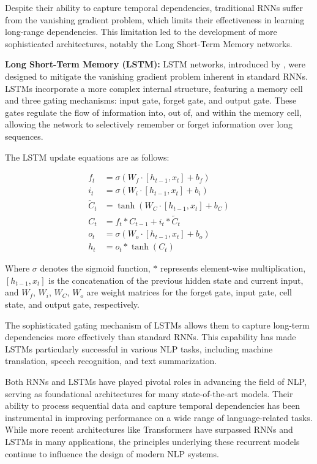 Despite their ability to capture temporal dependencies, traditional RNNs suffer from the vanishing gradient problem, which limits their effectiveness in learning long-range dependencies. This limitation led to the development of more sophisticated architectures, notably the Long Short-Term Memory networks.

\textbf{Long Short-Term Memory (LSTM):}
LSTM networks, introduced by \cite{hochreiter1997long}, were designed to mitigate the vanishing gradient problem inherent in standard RNNs. LSTMs incorporate a more complex internal structure, featuring a memory cell and three gating mechanisms: input gate, forget gate, and output gate. These gates regulate the flow of information into, out of, and within the memory cell, allowing the network to selectively remember or forget information over long sequences.

The LSTM update equations are as follows:

\begin{align}
f_t &= \sigma(W_f \cdot [h_{t-1}, x_t] + b_f) \\
i_t &= \sigma(W_i \cdot [h_{t-1}, x_t] + b_i) \\
\tilde{C}_t &= \tanh(W_C \cdot [h_{t-1}, x_t] + b_C) \\
C_t &= f_t * C_{t-1} + i_t * \tilde{C}_t \\
o_t &= \sigma(W_o \cdot [h_{t-1}, x_t] + b_o) \\
h_t &= o_t * \tanh(C_t)
\end{align}

Where $\sigma$ denotes the sigmoid function, $*$ represents element-wise multiplication, $[h_{t-1}, x_t]$ is the concatenation of the previous hidden state and current input, and $W_f$, $W_i$, $W_C$, $W_o$ are weight matrices for the forget gate, input gate, cell state, and output gate, respectively.

The sophisticated gating mechanism of LSTMs allows them to capture long-term dependencies more effectively than standard RNNs. This capability has made LSTMs particularly successful in various NLP tasks, including machine translation, speech recognition, and text summarization.

Both RNNs and LSTMs have played pivotal roles in advancing the field of NLP, serving as foundational architectures for many state-of-the-art models. Their ability to process sequential data and capture temporal dependencies has been instrumental in improving performance on a wide range of language-related tasks. While more recent architectures like Transformers have surpassed RNNs and LSTMs in many applications, the principles underlying these recurrent models continue to influence the design of modern NLP systems.

